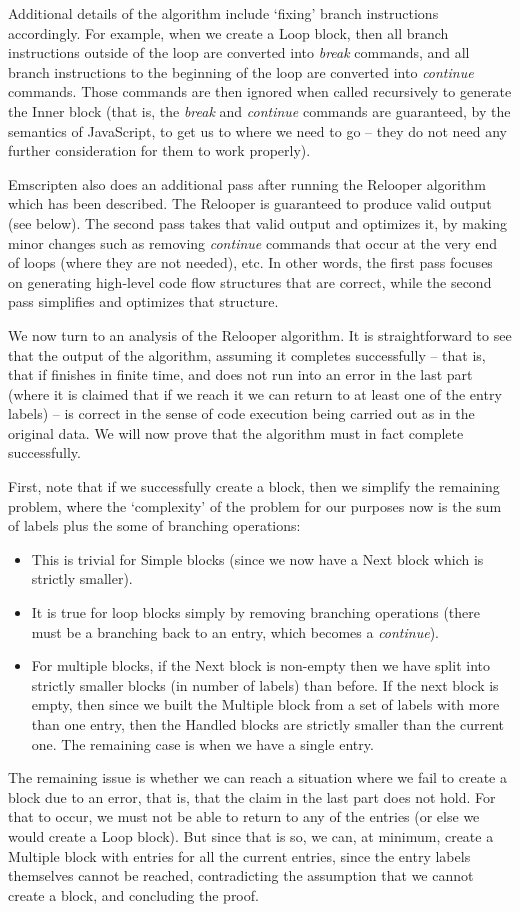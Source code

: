 \documentclass[11pt]{proc}
\begin{document}
Additional details of the algorithm include `fixing' branch
instructions accordingly. For example, when we create a Loop
block, then all branch instructions outside of the loop are
converted into \emph{break} commands, and all branch
instructions to the beginning of the loop are converted into
\emph{continue} commands. Those commands are then
ignored when called recursively to generate the Inner block (that is,
the \emph{break} and \emph{continue}
commands are guaranteed, by the semantics of JavaScript, to get us to
where we need to go -- they do not need any further consideration
for them to work properly).

Emscripten also does an additional pass after running the Relooper algorithm
which has been described. The Relooper is guaranteed to produce valid output (see below).
The second pass takes that valid output and optimizes it, by
making minor changes such as removing
\emph{continue} commands that occur at the very end of loops
(where they are not needed), etc. In other words, the first pass focuses on
generating high-level code flow structures that are correct,
while the second pass simplifies and optimizes that structure.

We now turn to an analysis of the Relooper algorithm. It is straightforward to see that the output of the algorithm,
assuming it completes successfully -- that is, that if finishes in finite time, and does
not run into an error in the last part (where it is claimed that
if we reach it we can return to at least one of the entry labels) --
is correct in the sense of code execution being carried out
as in the original data. We will now prove that the algorithm must
in fact complete successfully.

First, note that if we
successfully create a block, then we simplify the remaining
problem, where the `complexity' of the problem for our purposes
now is the sum of labels plus the some of branching operations:
\begin{itemize}
\item This is trivial for Simple blocks (since we now have a Next block
which is strictly smaller).
\item It is true for loop blocks simply by removing branching
operations (there must be a branching back to an entry, which
becomes a \emph{continue}).
\item For multiple blocks, if the Next block is non-empty then we have split into strictly
smaller blocks (in number of labels) than before. If the next block
is empty, then since we built the Multiple block from a set of labels
with more than one entry, then the Handled blocks are strictly smaller
than the current one. The remaining case is when we have a single entry.
\end{itemize}
The remaining issue is whether we can reach a situation where we
fail to create a block due to an error, that is, that the claim in the last
part does not hold. For that to occur, we must not be able
to return to any of the entries (or else we would create a Loop
block). But since that is so, we can, at minimum, create a Multiple
block with entries for all the current entries, since the entry
labels themselves cannot be reached, contradicting the assumption
that we cannot create a block, and concluding the proof.
\end{document}

